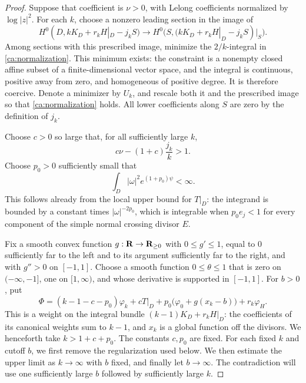 \begin{proof}
Suppose that coefficient is \(\nu>0\), with Lelong coefficients
normalized by \(\log|z|^2\).  For each \(k\), choose a nonzero
leading section in the image of
\[
 H^0(D,kK_D+r_kH|_D-j_kS)
 \longrightarrow
 H^0\bigl(S,(kK_D+r_kH|_D-j_kS)|_S\bigr).
\]
Among sections with this prescribed image, minimize the
\(2/k\)-integral in \eqref{ca:normalization}.  This minimum exists:
the constraint is a nonempty closed affine subset of a
finite-dimensional vector space, and the integral is continuous,
positive away from zero, and homogeneous of positive degree.
It is therefore coercive.  Denote a minimizer by \(U_k\), and
rescale both it and the prescribed image so that
\eqref{ca:normalization} holds.  All lower coefficients along \(S\)
are zero by the definition of \(j_k\).

Choose \(c>0\) so large that, for all sufficiently large \(k\),
\begin{equation}\label{ca:coefficient-choice}
 c\nu-(1+c)\frac{j_k}{k}>1.
\end{equation}
Choose \(p_0>0\) sufficiently small that
\begin{equation}\label{ca:fiber-integral}
 \int_D |\omega|^2e^{(1+p_0)\psi}<\infty.
\end{equation}
This follows already from the local upper bound for \(T|_D\): the
integrand is bounded by a constant times \(|\omega|^{-2p_0}\),
which is integrable when \(p_0e_j<1\) for every component of the
simple normal crossing divisor \(E\).

Fix a smooth convex function \(g:\mathbf R\to\mathbf R_{\geq0}\) with
\(0\leq g'\leq1\), equal to \(0\) sufficiently far to the left
and to its argument sufficiently far to the right, and with
\(g''>0\) on \([-1,1]\).  Choose a smooth function
\(0\leq\theta\leq1\) that is zero on \((-\infty,-1]\), one
on \([1,\infty)\), and whose derivative is supported in
\([-1,1]\).  For \(b>0\), put
\begin{equation}\label{ca:adjoint-weight}
 \Phi=(k-1-c-p_0)\varphi_k+cT|_D
          +p_0\bigl(\varphi_0+g(x_k-b)\bigr)+r_k\varphi_H.
\end{equation}
This is a weight on the integral bundle
\((k-1)K_D+r_kH|_D\): the coefficients of its canonical weights
sum to \(k-1\), and \(x_k\) is a global function off the divisors.
We henceforth take \(k>1+c+p_0\).  The constants $c,p_0$ are fixed.
For each fixed $k$ and cutoff $b$, we first remove the regularization
used below.  We then estimate the upper limit as $k\to\infty$ with
$b$ fixed, and finally let $b\to\infty$.  The contradiction will use
one sufficiently large $b$ followed by sufficiently large $k$.


\end{proof}
